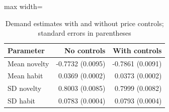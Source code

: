 \begin{table}[htbp]\centering\small
\caption{Demand estimates with and without price controls; standard errors in parentheses}
\label{tab:demand-comparison}
\begin{adjustbox}{max width=\linewidth}
\begin{tabular}{lrr}\toprule
Parameter & No controls & With controls\\\midrule
Mean novelty & -0.7732 (0.0095) & -0.7861 (0.0091) \\
Mean habit & 0.0369 (0.0002) & 0.0373 (0.0002) \\
SD novelty & 0.8003 (0.0085) & 0.7999 (0.0082) \\
SD habit & 0.0783 (0.0004) & 0.0793 (0.0004) \\
\bottomrule\end{tabular}
\end{adjustbox}
\end{table}
